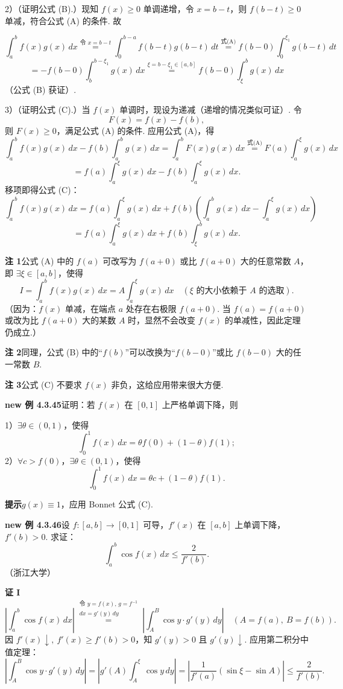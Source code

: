 \documentclass[UTF8, 12pt, fontset=fandol, oneside]{ctexart}
\begin{document}
2）（证明公式 (B).）现知 $f(x)\ge0$ 单调递增，令 $x=b-t$，则 $f(b-t)\ge0$ 单减，符合公式 (A) 的条件. 故

\[
\int_a^b f(x)g(x)\,dx\stackrel{\text{令 }x=b-t}{=}
\int_0^{b-a}f(b-t)g(b-t)\,dt
\stackrel{\text{式(A)}}{=}f(b-0)\int_0^{\xi_1}g(b-t)\,dt
\]
\[
=-f(b-0)\int_b^{b-\xi_1}g(x)\,dx
\stackrel{\xi=b-\xi_1\in[a,b]}{=}f(b-0)\int_\xi^b g(x)\,dx
\]
（公式 (B) 获证）.

3）（证明公式 (C).）当 $f(x)$ 单调时，现设为递减（递增的情况类似可证）. 令
\[
F(x)=f(x)-f(b),
\]
则 $F(x)\ge0$，满足公式 (A) 的条件. 应用公式 (A)，得
\[
\int_a^b f(x)g(x)\,dx-f(b)\int_a^b g(x)\,dx
=\int_a^b F(x)g(x)\,dx
\stackrel{\text{式(A)}}{=}F(a)\int_a^\xi g(x)\,dx
\]
\[
=f(a)\int_a^\xi g(x)\,dx-f(b)\int_a^\xi g(x)\,dx.
\]
移项即得公式 (C)：
\[
\int_a^b f(x)g(x)\,dx
=f(a)\int_a^\xi g(x)\,dx
+f(b)\left(\int_a^b g(x)\,dx-\int_a^\xi g(x)\,dx\right)
\]
\[
=f(a)\int_a^\xi g(x)\,dx+f(b)\int_\xi^b g(x)\,dx.
\]

\noindent\textbf{注 1}\quad 公式 (A) 中的 $f(a)$ 可改写为 $f(a+0)$ 或比 $f(a+0)$ 大的任意常数 $A$，即 $\exists\xi\in[a,b]$，使得
\[
I=\int_a^b f(x)g(x)\,dx=A\int_a^\xi g(x)\,dx
\quad(\xi\text{ 的大小依赖于 }A\text{ 的选取}).
\tag{A'}
\]
（因为：$f(x)$ 单减，在端点 $a$ 处存在右极限 $f(a+0)$. 当 $f(a)=f(a+0)$ 或改为比 $f(a+0)$ 大的某数 $A$ 时，显然不会改变 $f(x)$ 的单减性，因此定理仍成立.）

\noindent\textbf{注 2}\quad 同理，公式 (B) 中的“$f(b)$”可以改换为“$f(b-0)$”或比 $f(b-0)$ 大的任一常数 $B$.

\noindent\textbf{注 3}\quad 公式 (C) 不要求 $f(x)$ 非负，这给应用带来很大方便.

\noindent\textbf{new 例 4.3.45}\quad 证明：若 $f(x)$ 在 $[0,1]$ 上严格单调下降，则

1）$\exists\theta\in(0,1)$，使得
\[
\int_0^1 f(x)\,dx=\theta f(0)+(1-\theta)f(1);
\]
2）$\forall c>f(0)$，$\exists\theta\in(0,1)$，使得
\[
\int_0^1 f(x)\,dx=\theta c+(1-\theta)f(1).
\]

\noindent\textbf{提示}\quad $g(x)\equiv1$，应用 Bonnet 公式 (C).

\noindent\textbf{new 例 4.3.46}\quad 设 $f:[a,b]\to[0,1]$ 可导，$f'(x)$ 在 $[a,b]$ 上单调下降，$f'(b)>0$. 求证：
\[
\int_a^b \cos f(x)\,dx\le\frac2{f'(b)}.
\]
（浙江大学）

\noindent\textbf{证 I}\quad
\[
\left|\int_a^b\cos f(x)\,dx\right|
\stackrel{\substack{\text{令 }y=f(x),\,g=f^{-1}\\ dx=g'(y)\,dy}}{=}
\left|\int_A^B\cos y\cdot g'(y)\,dy\right|
\quad(A=f(a),\ B=f(b)).
\tag{1}
\]
因 $f'(x)\downarrow,\ f'(x)\ge f'(b)>0$，知 $g'(y)>0$ 且 $g'(y)\downarrow$. 应用第二积分中值定理：
\[
\left|\int_A^B\cos y\cdot g'(y)\,dy\right|
=\left|g'(A)\int_A^\xi\cos y\,dy\right|
=\left|\frac1{f'(a)}(\sin\xi-\sin A)\right|
\le\frac2{f'(b)}.
\]
\end{document}

